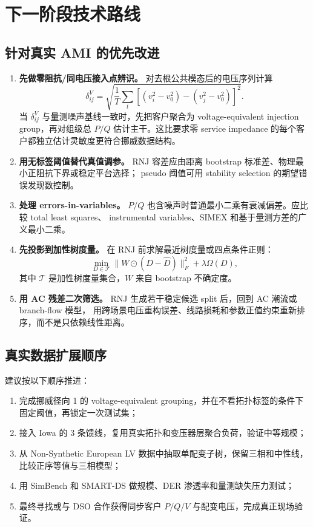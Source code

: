 \section{下一阶段技术路线}

\subsection{针对真实 AMI 的优先改进}

\begin{enumerate}
  \item \textbf{先做零阻抗/同电压接入点辨识。}
  对去根公共模态后的电压序列计算
  \[
  \delta_{ij}^{V}=
  \sqrt{\frac{1}{T}\sum_t
  \left[(v_i^2-v_0^2)-(v_j^2-v_0^2)\right]^2}.
  \]
  当 $\delta_{ij}^{V}$ 与量测噪声基线一致时，先把客户聚合为 voltage-equivalent
  injection group，再对组级总 $P/Q$ 估计主干。这比要求零 service impedance
  的每个客户都独立估计灵敏度更符合挪威数据结构。

  \item \textbf{用无标签阈值替代真值调参。}
  RNJ 容差应由距离 bootstrap 标准差、物理最小正阻抗下界或稳定平台选择；
  pseudo 阈值可用 stability selection 的期望错误发现数控制。

  \item \textbf{处理 errors-in-variables。}
  $P/Q$ 也含噪声时普通最小二乘有衰减偏差。应比较 total least squares、
  instrumental variables、SIMEX 和基于量测方差的广义最小二乘。

  \item \textbf{先投影到加性树度量。}
  在 RNJ 前求解最近树度量或四点条件正则：
  \[
  \min_{D\in\mathcal T}
  \|W\odot(D-\widehat D)\|_F^2+
  \lambda\Omega(D),
  \]
  其中 $\mathcal T$ 是加性树度量集合，$W$ 来自 bootstrap 不确定度。

  \item \textbf{用 AC 残差二次筛选。}
  RNJ 生成若干稳定候选 split 后，回到 AC 潮流或 branch-flow 模型，
  用跨场景电压重构误差、线路损耗和参数正值约束重新排序，而不是只依赖线性距离。
\end{enumerate}

\subsection{真实数据扩展顺序}

建议按以下顺序推进：
\begin{enumerate}
  \item 完成挪威径向 1 的 voltage-equivalent grouping，并在不看拓扑标签的条件下
  固定阈值，再锁定一次测试集；
  \item 接入 Iowa 的 3 条馈线，复用真实拓扑和变压器层聚合负荷，验证中等规模；
  \item 从 Non-Synthetic European LV 数据中抽取单配变子树，保留三相和中性线，
  比较正序等值与三相模型；
  \item 用 SimBench 和 SMART-DS 做规模、DER 渗透率和量测缺失压力测试；
  \item 最终寻找或与 DSO 合作获得同步客户 $P/Q/V$ 与配变电压，完成真正现场验证。
\end{enumerate}

